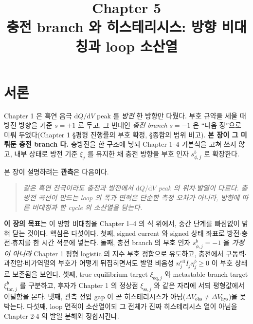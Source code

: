 \documentclass[11pt,a4paper]{article}
\title{\textbf{\LARGE Chapter 5}\\[0.35em]\Large 충전 branch 와 히스테리시스: 방향 비대칭과 loop 소산열}
\author{}
\date{}
\newcommand{\dd}{\mathrm{d}}
\newcommand{\eff}{\mathrm{eff}}
\newcommand{\eq}{\mathrm{eq}}
\newcommand{\sstat}{\mathrm{ss}}
\newcommand{\hys}{\mathrm{hys}}
\newcommand{\obs}{\mathrm{obs}}
\newcommand{\tar}{\mathrm{tar}}
\begin{document}
\maketitle

\section*{서론}
Chapter 1 은 흑연 음극 $\dd Q/\dd V$ peak 를 \emph{방전} 한 방향만 다뤘다. 부호 규약을 세울 때 방전 방향을 기준
$s=+1$ 로 두고, 그 반대인 \emph{충전 branch} $s=-1$ 은 ``다음 장''으로 미뤄 두었다(Chapter 1 \S 평형 진행률의
부호 확정, \S 종합의 범위 비고). \textbf{본 장이 그 미뤄둔 충전 branch 다.} 충방전을 한 구조에 넣되 Chapter 1--4
기본식을 고쳐 쓰지 않고, 내부 상태로 방전 기준 $\xi_j$ 를 유지한 채 충전 방향을 부호 인자 $s_{\phi,j}^b$ 로
확장한다.

본 장이 설명하려는 \textbf{관측}은 다음이다.
\begin{quote}\itshape
같은 흑연 전극이라도 충전과 방전에서 $\dd Q/\dd V$ peak 의 위치$\cdot$발열이 다르다. 충방전 곡선이 만드는
loop 의 폭과 면적은 단순한 측정 오차가 아니라, 방향에 따른 \emph{비대칭}과 한 cycle 의 \emph{소산열}을 담는다.
\end{quote}

\textbf{이 장의 목표}는 이 방향 비대칭을 Chapter 1--4 의 식 위에서, 중간 단계를 빠짐없이 밝혀 닫는 것이다.
핵심은 다섯이다. 첫째, signed current 와 signed 상태 좌표로 방전$\cdot$충전$\cdot$휴지를 한 시간 적분에 넣는다.
둘째, 충전 branch 의 부호 인자 $s_{\phi,j}^b=-1$ 을 \emph{가정이 아니라} Chapter 1 평형 logistic 의 지수 부호
정합으로 유도하고, 충전에서 구동력$\cdot$과전압$\cdot$비가역열의 부호가 어떻게 뒤집히면서도 발열 비음성
$n_j^{\eff}I_j\eta_j^b\ge0$ 이 부호 상쇄로 보존됨을 보인다. 셋째, true equilibrium target $\xi_{\eq,j}$ 와
metastable branch target $\xi_{\tar,j}^b$ 를 구분하고, 후자가 Chapter 1 의 정상점 $\xi_{\sstat,j}$ 와 같은 자리에
서되 평형값에서 이탈함을 본다. 넷째, 관측 전압 gap 이 곧 히스테리시스가 아님($\Delta V_\obs\ne\Delta V_\hys$)을
못박는다. 다섯째, loop 면적이 소산열이되 그 전체가 진짜 히스테리시스 열이 아님을 Chapter 2$\cdot$4 의 발열 분해와
정합시킨다.

\tableofcontents
\newpage

\end{document}
